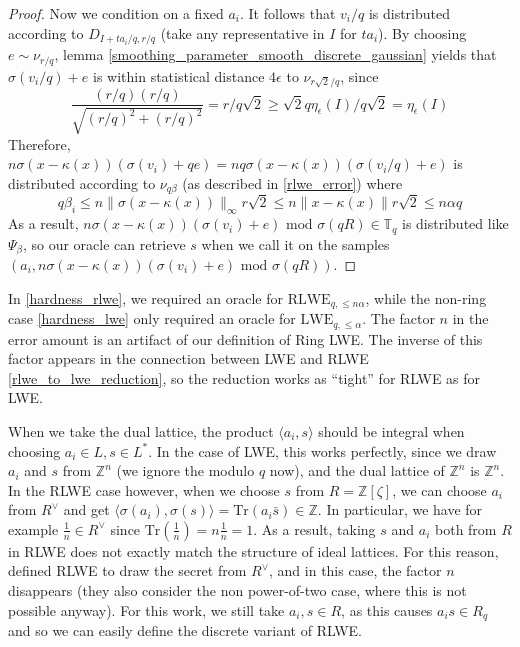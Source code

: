 \documentclass{report}
\newcommand{\T}{\mathbb{T}}
\newcommand{\Z}{\mathbb{Z}}
\renewcommand{\mod}{\text{ mod }}
\begin{document}
\begin{proof}
Now we condition on a fixed $a_i$. It follows that $v_i / q$ is distributed according to $D_{I + ta_i / q, r / q}$ (take any representative in $I$ for $ta_i$). By choosing $e \sim \nu_{r / q}$, lemma \ref{smoothing_parameter_smooth_discrete_gaussian} yields that $\sigma(v_i / q) + e$ is within statistical distance $4\epsilon$ to $\nu_{r\sqrt{2}/ q}$, since
\begin{equation}
\frac {(r / q)(r / q)} {\sqrt{(r / q)^2 + (r / q)^2}} = r / q\sqrt{2} \geq \sqrt{2}q\eta_\epsilon(I) / q\sqrt{2} = \eta_\epsilon(I) \nonumber
\end{equation}
Therefore, $n \sigma(x - \kappa(x)) (\sigma(v_i) + qe) = nq \sigma(x - \kappa(x)) (\sigma(v_i/q) + e)$ is distributed according to $\nu_{q\beta}$ (as described in \ref{rlwe_error}) where 
\begin{equation}
q \beta_i \leq n \| \sigma(x - \kappa(x)) \|_\infty r \sqrt{2} \leq n \| x - \kappa(x) \| r \sqrt{2} \leq n \alpha q \nonumber
\end{equation}
As a result, $n\sigma(x - \kappa(x))(\sigma(v_i) + e) \mod \sigma(qR) \in \T_q$ is distributed like $\Psi_\beta$, so our oracle can retrieve $s$ when we call it on the samples $(a_i, n\sigma(x - \kappa(x))(\sigma(v_i) + e) \mod \sigma(qR))$. \qedhere
\end{proof}

\remark
In \ref{hardness_rlwe}, we required an oracle for $\mathrm{RLWE}_{q, \leq n \alpha}$, while the non-ring case \ref{hardness_lwe} only required an oracle for $\mathrm{LWE}_{q, \leq \alpha}$. The factor $n$ in the error amount is an artifact of our definition of Ring LWE. The inverse of this factor appears in the connection between LWE and RLWE \ref{rlwe_to_lwe_reduction}, so the reduction works as ``tight'' for RLWE as for LWE.

When we take the dual lattice, the product $\langle a_i, s \rangle$  should be integral when choosing $a_i \in L, s \in L^*$. In the case of LWE, this works perfectly, since we draw $a_i$ and $s$ from $\Z^n$ (we ignore the modulo $q$ now), and the dual lattice of $\Z^n$ is $\Z^n$. In the RLWE case however, when we choose $s$ from $R = \Z[\zeta]$, we can choose $a_i$ from $R^\vee$ and get $\langle \sigma(a_i), \sigma(s) \rangle = \mathrm{Tr}(a_i \bar{s}) \in \Z$. In particular, we have for example $\frac 1 n \in R^\vee$ since $\mathrm{Tr}(\frac 1 n) = n \frac 1 n = 1$. As a result, taking $s$ and $a_i$ both from $R$ in RLWE does not exactly match the structure of ideal lattices. For this reason, \cite{LyuPeiReg} defined RLWE to draw the secret from $R^\vee$, and in this case, the factor $n$ disappears (they also consider the non power-of-two case, where this is not possible anyway). For this work, we still take $a_i, s \in R$, as this causes $a_i s \in R_q$ and so we can easily define the discrete variant of RLWE.
\end{document}
